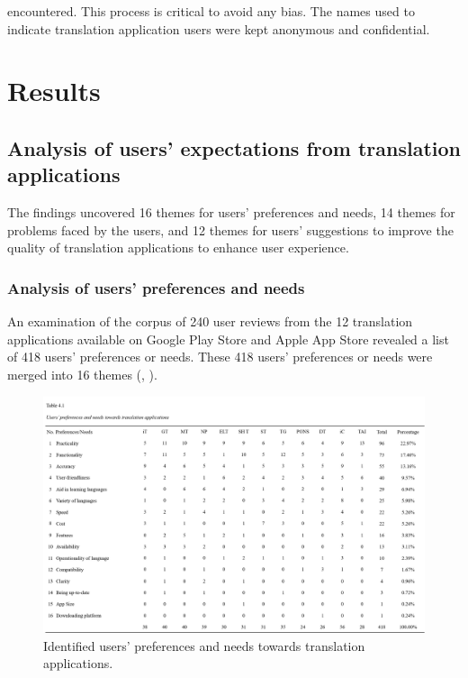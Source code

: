 \documentclass[english]{textolivre}
\begin{document}
encountered. This process is critical to avoid any bias. The names used to indicate translation application users were kept anonymous and confidential.

\section{Results}\label{sec-resumo}
\subsection{Analysis of users’ expectations from translation applications}
The findings uncovered 16 themes for users’ preferences and needs, 14 themes for problems faced by the users, and 12 themes for users’ suggestions to improve the quality of translation applications to enhance user experience.

\subsubsection{Analysis of users’ preferences and needs}\label{sec-secoes}
An examination of the corpus of 240 user reviews from the 12 translation applications available on Google Play Store and Apple App Store revealed a list of 418 users’ preferences or needs. These 418 users’ preferences or needs were merged into 16 themes (, ).

\begin{figure}[h!]
    \centering
    \includegraphics[width=\linewidth]{Fig2.png}
    \caption{Identified users’ preferences and needs towards translation applications.}
    \label{fig2}
\end{figure}
\end{document}
